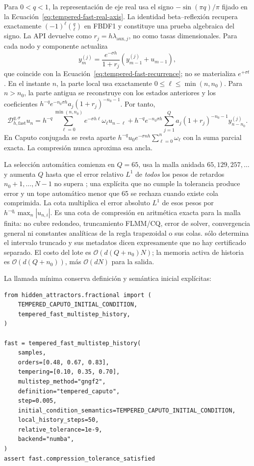 Para \(0<q<1\), la representación de eje real usa el signo
\(-\sin(\pi q)/\pi\) fijado en la
Ecuación~\eqref{eq:tempered-fast-real-axis}. La identidad beta--reflexión
recupera exactamente \((-1)^\ell\binom q\ell\) en FBDF1 y constituye una
prueba algebraica del signo. La API devuelve
 como \(r_j=h\lambda_{\mathrm{aux},j}\), no como
tasas dimensionales. Para cada nodo y componente actualiza
\[
 y_m^{(j)}=\frac{e^{-\sigma h}}{1+r_j}
 \left(y_{m-1}^{(j)}+u_{m-1}\right),
\]
que coincide con la Ecuación~\eqref{eq:tempered-fast-recurrence}; no se
materializa \(e^{+\sigma t}\). En el instante \(n\), la parte local usa
exactamente \(0\le\ell\le\min(n,n_0)\). Para \(n>n_0\), la parte antigua se
reconstruye con los estados anteriores y los coeficientes
\(h^{-q}e^{-n_0\sigma h}a_j(1+r_j)^{-n_0-1}\). Por tanto,
\[
 \mathcal D_{h,\mathrm{fast}}^{q,\sigma}u_n=
 h^{-q}\sum_{\ell=0}^{\min(n,n_0)}
 e^{-\sigma h\ell}\omega_\ell u_{n-\ell}
 +h^{-q}e^{-n_0\sigma h}\sum_{j=1}^{Q}
 a_j(1+r_j)^{-n_0-1}y_{n-n_0}^{(j)}.
\]
En Caputo conjugada se resta aparte
\(h^{-q}u_0e^{-\sigma nh}\sum_{\ell=0}^{n}\omega_\ell\) con la suma parcial
exacta. La compresión nunca aproxima esa ancla.

La selección automática comienza en \(Q=65\), usa la malla anidada
\(65,129,257,\ldots\) y aumenta \(Q\) hasta que el error relativo \(L^1\) de \emph{todos} los pesos de
retardos \(n_0+1,\ldots,N-1\) no supera
; una  explícita que
no cumple la tolerancia produce error y un tope automático menor que 65 se
rechaza cuando existe cola comprimida. La cota
 multiplica el error absoluto \(L^1\)
de esos pesos por \(h^{-q_i}\max_n|u_{n,i}|\). Es una cota de compresión en
aritmética exacta para la malla finita: no cubre redondeo, truncamiento
FLMM/CQ, error de solver, convergencia general ni constantes analíticas de la
regla trapezoidal o sus colas.  sólo determina el
intervalo truncado y sus metadatos dicen expresamente que no hay certificado
separado. El costo del lote es \(\mathcal O(d(Q+n_0)N)\); la memoria activa de
historia es \(\mathcal O(d(Q+n_0))\), más \(\mathcal O(dN)\) para la salida.

La llamada mínima conserva definición y semántica inicial explícitas:
\begin{verbatim}
from hidden_attractors.fractional import (
    TEMPERED_CAPUTO_INITIAL_CONDITION,
    tempered_fast_multistep_history,
)

fast = tempered_fast_multistep_history(
    samples,
    orders=[0.48, 0.67, 0.83],
    tempering=[0.10, 0.35, 0.70],
    multistep_method="gngf2",
    definition="tempered_caputo",
    step=0.005,
    initial_condition_semantics=TEMPERED_CAPUTO_INITIAL_CONDITION,
    local_history_steps=50,
    relative_tolerance=1e-9,
    backend="numba",
)
assert fast.compression_tolerance_satisfied
\end{verbatim}

